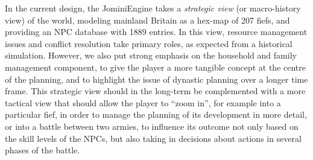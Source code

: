 \documentclass[11pt]{article}
\begin{document}

In the current design, the JominiEngine takes a  \emph{strategic view\/} (or macro-history view) of the world, modeling
mainland Britain as a hex-map of 207 fiefs, and providing an NPC database with 1889 entries. In this view,
resource management issues and conflict resolution take primary roles, as expected from a historical
simulation. However, we also put strong emphasis on the household and family management component, to give the
player a more tangible concept at the centre of the planning, and to highlight the issue of dynastic planning
over a longer time frame. This strategic view should in the long-term be complemented with a more tactical
view that should allow the player to ``zoom in'', for example into a particular fief, in order to manage the
planning of its development in more detail, or into a battle between two armies, to influence its outcome not
only based on the skill levels of the NPCs, but also taking in decisions about actions in several phases of
the battle.


\end{document}
